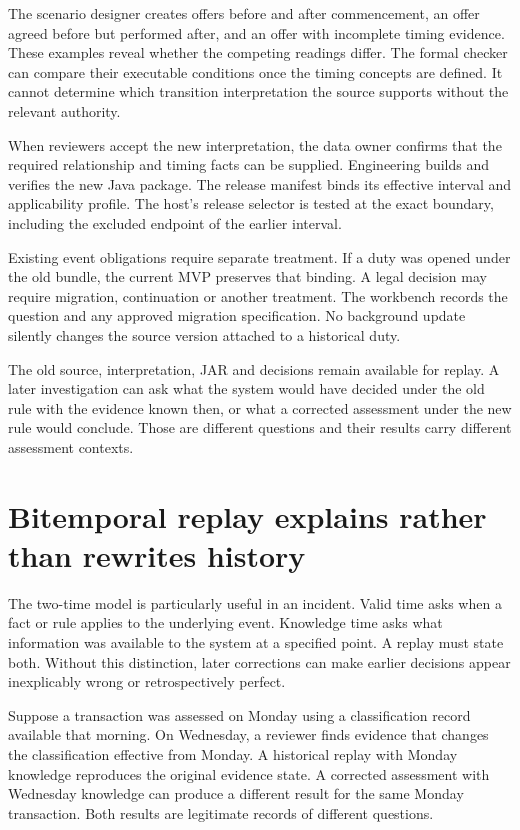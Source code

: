 \documentclass[12pt,a4paper,oneside,openany]{book}
\begin{document}
The scenario designer creates offers before and after commencement, an offer
agreed before but performed after, and an offer with incomplete timing evidence.
These examples reveal whether the competing readings differ. The formal checker
can compare their executable conditions once the timing concepts are defined.
It cannot determine which transition interpretation the source supports without
the relevant authority.

When reviewers accept the new interpretation, the data owner confirms that the
required relationship and timing facts can be supplied. Engineering builds and
verifies the new Java package. The release manifest binds its effective interval
and applicability profile. The host's release selector is tested at the exact
boundary, including the excluded endpoint of the earlier interval.

Existing event obligations require separate treatment. If a duty was opened under
the old bundle, the current MVP preserves that binding. A legal decision may
require migration, continuation or another treatment. The workbench records the
question and any approved migration specification. No background update silently
changes the source version attached to a historical duty.

The old source, interpretation, JAR and decisions remain available for replay.
A later investigation can ask what the system would have decided under the old
rule with the evidence known then, or what a corrected assessment under the new
rule would conclude. Those are different questions and their results carry
different assessment contexts.

\section{Bitemporal replay explains rather than rewrites history}

The two-time model is particularly useful in an incident. Valid time asks when a
fact or rule applies to the underlying event. Knowledge time asks what information
was available to the system at a specified point. A replay must state both.
Without this distinction, later corrections can make earlier decisions appear
inexplicably wrong or retrospectively perfect.

Suppose a transaction was assessed on Monday using a classification record
available that morning. On Wednesday, a reviewer finds evidence that changes the
classification effective from Monday. A historical replay with Monday knowledge
reproduces the original evidence state. A corrected assessment with Wednesday
knowledge can produce a different result for the same Monday transaction. Both
results are legitimate records of different questions.
\end{document}
